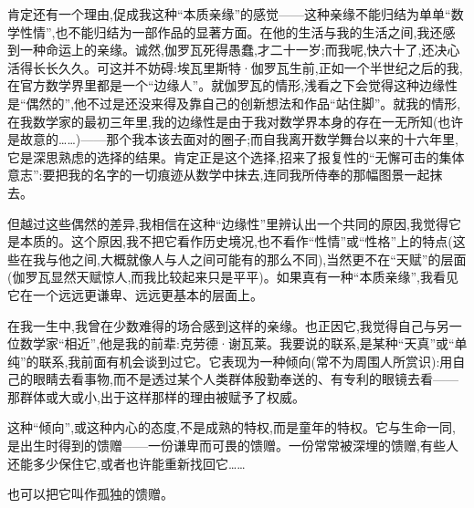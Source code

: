 肯定还有一个理由,促成我这种“本质亲缘”的感觉——这种亲缘不能归结为单单“数学性情”,也不能归结为一部作品的显著方面。在他的生活与我的生活之间,我还感到一种命运上的亲缘。诚然,伽罗瓦死得愚蠢,才二十一岁;而我呢,快六十了,还决心活得长长久久。可这并不妨碍:埃瓦里斯特·伽罗瓦生前,正如一个半世纪之后的我,在官方数学界里都是一个“边缘人”。就伽罗瓦的情形,浅看之下会觉得这种边缘性是“偶然的”,他不过是还没来得及靠自己的创新想法和作品“站住脚”。就我的情形,在我数学家的最初三年里,我的边缘性是由于我对数学界本身的存在一无所知(也许是故意的……)——那个我本该去面对的圈子;而自我离开数学舞台以来的十六年里,它是深思熟虑的选择的结果。肯定正是这个选择,招来了报复性的“无懈可击的集体意志”:要把我的名字的一切痕迹从数学中抹去,连同我所侍奉的那幅图景一起抹去。

但越过这些偶然的差异,我相信在这种“边缘性”里辨认出一个共同的原因,我觉得它是本质的。这个原因,我不把它看作历史境况,也不看作“性情”或“性格”上的特点(这些在我与他之间,大概就像人与人之间可能有的那么不同),当然更不在“天赋”的层面(伽罗瓦显然天赋惊人,而我比较起来只是平平)。如果真有一种“本质亲缘”,我看见它在一个远远更谦卑、远远更基本的层面上。

在我一生中,我曾在少数难得的场合感到这样的亲缘。也正因它,我觉得自己与另一位数学家“相近”,他是我的前辈:克劳德·谢瓦莱。我要说的联系,是某种“天真”或“单纯”的联系,我前面有机会谈到过它。它表现为一种倾向(常不为周围人所赏识):用自己的眼睛去看事物,而不是透过某个人类群体殷勤奉送的、有专利的眼镜去看——那群体或大或小,出于这样那样的理由被赋予了权威。

这种“倾向”,或这种内心的态度,不是成熟的特权,而是童年的特权。它与生命一同,是出生时得到的馈赠——一份谦卑而可畏的馈赠。一份常常被深埋的馈赠,有些人还能多少保住它,或者也许能重新找回它……

也可以把它叫作孤独的馈赠。
